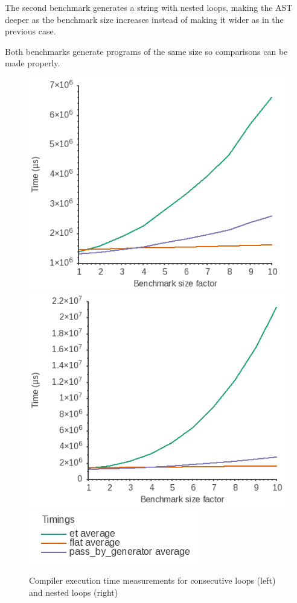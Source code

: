 \documentclass[../main]{subfiles}
\begin{document}
The second benchmark generates a string with
nested loops, making the AST deeper as the benchmark size increases instead
of making it wider as in the previous case.

Both benchmarks generate programs of the same size so comparisons can be made
properly.

\begin{figure}
\includegraphics[scale=0.5]{images/bf-consecutive_loops.png}
\includegraphics[scale=0.5]{images/bf-imbricated_loops.png}
\includegraphics[scale=0.5]{images/bf-graph-legend.png}
\caption{
  Compiler execution time measurements for consecutive loops (left)
  and nested loops (right)
}\label{fig:bf-bench}
\end{figure}
\end{document}
